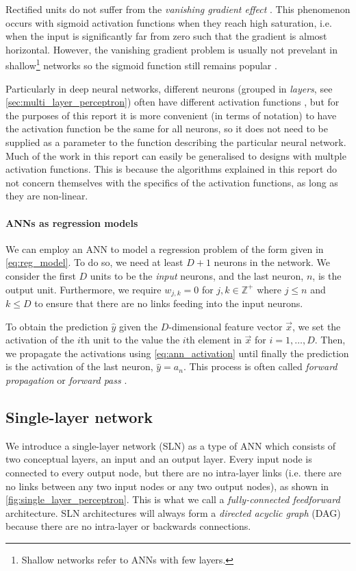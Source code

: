 Rectified units do not suffer from the \textit{vanishing gradient effect} \cite{glorot2011}.
This phenomenon occurs with sigmoid activation functions when they reach high saturation, i.e. when the input is significantly far from zero such that the gradient is almost horizontal.
However, the vanishing gradient problem is usually not prevelant in shallow\footnote{Shallow networks refer to ANNs with few layers.} networks so the sigmoid function still remains popular \cite{neal1992}.

Particularly in deep neural networks, different neurons (grouped in \textit{layers}, see \ref{sec:multi_layer_perceptron}) often have different activation functions \cite{burkov2019}, but for the purposes of this report it is more convenient (in terms of notation) to have the activation function be the same for all neurons, so it does not need to be supplied as a parameter to the function describing the particular neural network.
Much of the work in this report can easily be generalised to designs with multple activation functions.
This is because the algorithms explained in this report do not concern themselves with the specifics of the activation functions, as long as they are non-linear.

\paragraph{ANNs as regression models}
We can employ an ANN to model a regression problem of the form given in \ref{eq:reg_model}. 
To do so, we need at least $D+1$ neurons in the network. 
We consider the first $D$ units to be the \textit{input} neurons, and the last neuron, $n$, is the output unit.
Furthermore, we require $w_{j,k}=0$ for $j,k \in \mathbb{Z}^+$ where $j \leq n$ and $k \leq D$ to ensure that there are no links feeding into the input neurons.

To obtain the prediction $\hat{y}$ given the $D$-dimensional feature vector $\vec{x}$, we set the activation of the $i$th unit to the value the $i$th element in $\vec{x}$ for $i=1,\dots,D$.
Then, we propagate the activations using \ref{eq:ann_activation} until finally the prediction is the activation of the last neuron, $\hat{y}=a_n$.
This process is often called \textit{forward propagation} or \textit{forward pass} \cite{burkov2019}.

\subsection{Single-layer network}
We introduce a single-layer network (SLN) as a type of ANN which consists of two conceptual layers, an input and an output layer.
Every input node is connected to every output node, but there are no intra-layer links (i.e. there are no links between any two input nodes or any two output nodes), as shown in \ref{fig:single_layer_perceptron}. 
This is what we call a \textit{fully-connected feedforward} architecture.
SLN architectures will always form a \textit{directed acyclic graph} (DAG) because there are no intra-layer or backwards connections.

